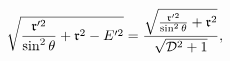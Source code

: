 \begin{equation*}
\sqrt{\frac{\frak{r}^{\prime 2}}{\sin ^{2}\theta }+\frak{r}^{2}-E^{\prime 2}}%
=\frac{\sqrt{\frac{\frak{r}^{\prime 2}}{\sin ^{2}\theta }+\frak{r}^{2}}}{%
\sqrt{\mathcal{D}^{2}+1}},
\end{equation*}

